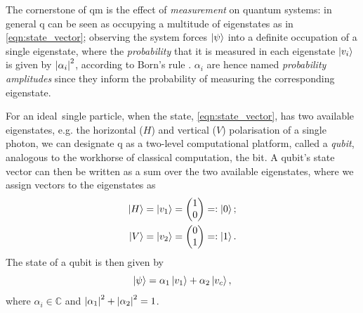 The cornerstone of \gls{qm} is the effect of \emph{measurement} on quantum systems: 
    in general \gls{q} can be seen as occupying a multitude of eigenstates as in \cref{eqn:state_vector};
    observing the system forces $\ket{\psi}$ into a definite occupation of a single eigenstate,
    where the \emph{probability} that it is measured in each eigenstate $\ket{v_i}$ is given by $\left\lvert \alpha_i \right\rvert^2$, 
    according to Born's rule \cite{born1926quantenmechanik}.
$\alpha_i$ are hence named \emph{probability amplitudes} since they inform the probability of measuring the corresponding eigenstate. 
\par 

For an ideal\footnotemark \ single particle, when the state, \cref{eqn:state_vector}, has two available eigenstates, 
    e.g. the horizontal ($H$) and vertical ($V$) polarisation of a single photon, 
    we can designate \gls{q} as a two-level computational platform, called a \emph{qubit}, 
    analogous to the workhorse of classical computation, the bit. 
A qubit's state vector can then be written as a sum over the two available eigenstates, 
    where we assign vectors to the eigenstates as 
\begin{equation}
    \begin{split}
        \ket{H} = \ket{v_1} = \left(\begin{matrix}1 \\ 0 \end{matrix}\right) =: \ket{0}; \\
        \ket{V} = \ket{v_2} = \left(\begin{matrix}0 \\ 1\end{matrix}\right) =: \ket{1}. 
    \end{split}
\end{equation}
The state of a qubit is then given by 
\begin{equation}
    \label{eqn:qubit_state}
    \ket{\psi} = \alpha_1 \ket{v_1} + \alpha_2 \ket{v_c},
\end{equation}
where $\alpha_i \in \mathbb{C}$ and $\left\lvert \alpha_1 \right\rvert^2 + \left\lvert \alpha_2 \right\rvert^2 = 1$. 
\par

